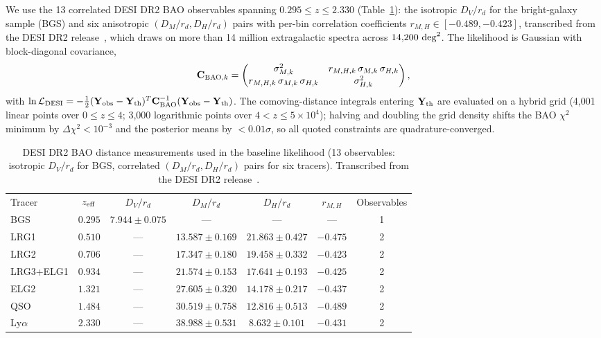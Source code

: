 \documentclass[aps,prd,preprint,superscriptaddress,nofootinbib]{revtex4-2}
\begin{document}
We use the 13 correlated DESI DR2 BAO observables spanning $0.295 \le z \le 2.330$ (Table~\ref{tab:bao}): the isotropic $D_V/r_d$ for the bright-galaxy sample (BGS) and six anisotropic $(D_M/r_d, D_H/r_d)$ pairs with per-bin correlation coefficients $r_{M,H} \in [-0.489, -0.423]$, transcribed from the DESI DR2 release~\cite{DESI2025}, which draws on more than 14 million extragalactic spectra across $14{,}200~{\rm deg}^2$. The likelihood is Gaussian with block-diagonal covariance,
\begin{equation}
\mathbf{C}_{{\rm BAO},k} = \begin{pmatrix} \sigma_{M,k}^2 & r_{M,H,k}\,\sigma_{M,k}\,\sigma_{H,k} \\ r_{M,H,k}\,\sigma_{M,k}\,\sigma_{H,k} & \sigma_{H,k}^2 \end{pmatrix},
\label{eq:cov}
\end{equation}
with $\ln \mathcal{L}_{\rm DESI} = -\frac{1}{2}(\mathbf{Y}_{\rm obs} - \mathbf{Y}_{\rm th})^T \mathbf{C}_{\rm BAO}^{-1} (\mathbf{Y}_{\rm obs} - \mathbf{Y}_{\rm th})$. The comoving-distance integrals entering $\mathbf{Y}_{\rm th}$ are evaluated on a hybrid grid (4{,}001 linear points over $0 \le z \le 4$; 3{,}000 logarithmic points over $4 < z \le 5 \times 10^4$); halving and doubling the grid density shifts the BAO $\chi^2$ minimum by $\Delta\chi^2 < 10^{-3}$ and the posterior means by $< 0.01\sigma$, so all quoted constraints are quadrature-converged.

\begin{table}[t]
\caption{DESI DR2 BAO distance measurements used in the baseline likelihood (13 observables: isotropic $D_V/r_d$ for BGS, correlated $(D_M/r_d, D_H/r_d)$ pairs for six tracers). Transcribed from the DESI DR2 release~\cite{DESI2025}.}
\label{tab:bao}
\begin{ruledtabular}
\begin{tabular}{lcccccc}
Tracer & $z_{\rm eff}$ & $D_V/r_d$ & $D_M/r_d$ & $D_H/r_d$ & $r_{M,H}$ & Observables \\
\colrule
BGS & $0.295$ & $7.944 \pm 0.075$ & --- & --- & --- & 1 \\
LRG1 & $0.510$ & --- & $13.587 \pm 0.169$ & $21.863 \pm 0.427$ & $-0.475$ & 2 \\
LRG2 & $0.706$ & --- & $17.347 \pm 0.180$ & $19.458 \pm 0.332$ & $-0.423$ & 2 \\
LRG3+ELG1 & $0.934$ & --- & $21.574 \pm 0.153$ & $17.641 \pm 0.193$ & $-0.425$ & 2 \\
ELG2 & $1.321$ & --- & $27.605 \pm 0.320$ & $14.178 \pm 0.217$ & $-0.437$ & 2 \\
QSO & $1.484$ & --- & $30.519 \pm 0.758$ & $12.816 \pm 0.513$ & $-0.489$ & 2 \\
Ly$\alpha$ & $2.330$ & --- & $38.988 \pm 0.531$ & $8.632 \pm 0.101$ & $-0.431$ & 2 \\
\end{tabular}
\end{ruledtabular}
\end{table}
\end{document}
